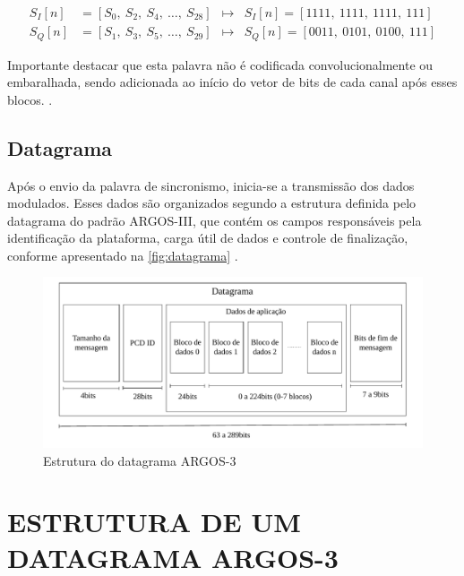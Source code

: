 \vspace{-1em}
\begin{equation}
\begin{aligned}
    S_I[n] &= [S_0,\ S_2,\ S_4,\ \dots,\ S_{28}] &\mapsto&  S_I[n] = [1111,\ 1111,\ 1111,\ 111]     \\
    S_Q[n] &= [S_1,\ S_3,\ S_5,\ \dots,\ S_{29}] &\mapsto&  S_Q[n] = [0011,\ 0101,\ 0100,\ 111]
\end{aligned}
\label{eq:intercalacao}
\end{equation}

\noindent Importante destacar que esta palavra não é codificada convolucionalmente ou embaralhada, sendo adicionada ao início do vetor de bits de cada canal após esses blocos.  \cite{cnes_services_and_message_formats_ed2_rev2_2006}. 

\subsection{Datagrama}

Após o envio da palavra de sincronismo, inicia-se a transmissão dos dados modulados. Esses dados são organizados segundo a estrutura definida pelo datagrama do padrão \gls{ARGOS-III}, que contém os campos responsáveis pela identificação da plataforma, carga útil de dados e controle de finalização, conforme apresentado na \autoref{fig:datagrama} \cite{cnes_services_and_message_formats_ed2_rev2_2006}.

\begin{figure}[H]
	\centering
	\caption{Estrutura do datagrama ARGOS-3}\label{fig:datagrama}
	\includegraphics[width=\linewidth]{assets/datagrama.pdf}
    
\end{figure}

\section{ESTRUTURA DE UM DATAGRAMA ARGOS-3}

